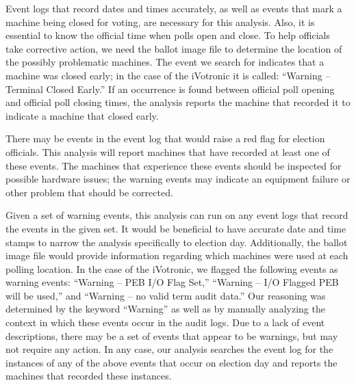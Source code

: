 Event logs that record dates and times accurately, as well as events
that mark a machine being closed for voting, are necessary for this
analysis. Also, it is essential to know the official time when polls
open and close. To help officials take corrective action, we need the
ballot image file to determine the location of the possibly
problematic machines. The event we search for indicates that a machine
was closed early; in the case of the iVotronic it is called:
\textquotedblleft Warning -- Terminal Closed
Early.\textquotedblright \hspace{2 mm} If an occurrence is found between
official poll opening and official poll closing times, the analysis reports the
machine that recorded it to indicate a machine that closed early.  

There may be events in the event log that would raise a red flag for election officials. This analysis will report machines that have recorded at least one of these events. The machines that experience these events should be inspected for possible hardware issues; the warning events may indicate an equipment failure or other problem that should be corrected.

Given a set of warning events, this analysis can run on any event logs that record the events in the given set. It would be beneficial to have accurate date and time stamps to narrow the analysis specifically to election day. Additionally, the ballot image file would provide information regarding which machines were used at each polling location.  In the case of the iVotronic, we flagged the following events as warning events: \textquotedblleft Warning -- PEB I/O Flag Set,\textquotedblright \hspace{1 mm} \textquotedblleft Warning -- I/O Flagged PEB will be used,\textquotedblright \hspace{1 mm} and \textquotedblleft Warning -- no valid term audit data.\textquotedblright \hspace{2 mm} Our reasoning was determined by the keyword \textquotedblleft Warning\textquotedblright \hspace{1 mm} as well as by manually analyzing the context in which these events occur in the audit logs. Due to a lack of event descriptions, there may be a set of events that appear to be warnings, but may not require any action. In any case, our analysis searches the event log for the instances of any of the above events that occur on election day and reports the machines that recorded these instances. 
